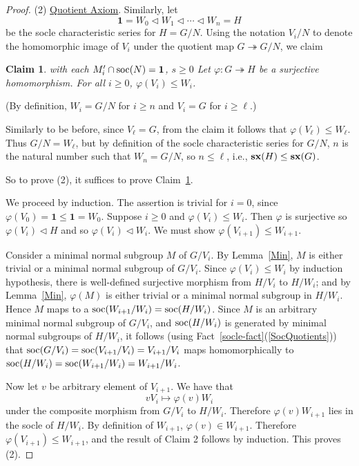 \documentclass[a4paper,11pt]{amsart}
\newtheorem{claim}{Claim}
\theoremstyle{definition}
\newcommand{\sx}{{\bf sx}}
\newcommand{\soc}{\mbox{\rm soc}}
\newcommand{\sur}{\twoheadrightarrow}
\newcommand{\1}{{\mathbf 1}}
\begin{document}
\begin{proof}
\noindent
 (2) \underline{Quotient Axiom}.    Similarly, let 
$$\1 =W_0 \lhd W_1 \lhd \cdots \lhd W_{n} = H$$
be the socle characteristic series for $H=G/N$.  Using the notation $V_i/N$ to denote the homomorphic image of $V_i$ under the quotient map $G\sur G/N$, we claim
\begin{claim} \label{Qclaim}with each $M_i'\cap \soc(N)=\1$, $s\geq 0$
Let $\varphi:G \sur H$ be a surjective homomorphism.
For all $i\geq 0$,
$\varphi(V_i) \leq W_i$.
 \end{claim}
 
 \noindent (By definition, $W_i=G/N$ for $i\geq n$ and $V_i=G$ for $i\geq \ell$.)


Similarly to be before, since $V_{\ell}=G$, from the claim it follows that $\varphi(V_{\ell})  \leq W_{\ell}$.  Thus $G/N=W_{\ell}$, but by definition of the socle characteristic series for $G/N$, $n$ is the natural number such that
$W_n=G/N$, so $n \leq \ell$, i.e., $\sx(H)\leq \sx(G)$.


So to prove (2), it suffices to  prove Claim~\ref{Qclaim}. 

  We proceed by induction. The assertion is trivial for $i=0$, since $\varphi(V_0)=\1 \leq \1 =W_0$.  
Suppose $i\geq 0$ and $\varphi(V_i)\leq W_i$.
Then $\varphi$ is surjective so $\varphi(V_i)\lhd H$ and so $\varphi(V_i) \lhd W_i$.
We must show $\varphi(V_{i+1})\leq W_{i+1}$.

Consider a minimal normal subgroup $M$ of $G/V_i$.
By Lemma~\ref{Min},  $M$ is either trivial or a minimal normal subgroup of $G/V_i$.  Since $\varphi(V_i) \leq W_i$ by induction hypothesis, there is well-defined surjective morphism from $H/V_i$ to $H/W_i$; and by Lemma~\ref{Min},
$\varphi(M)$ is either trivial or a minimal normal subgroup in $H/W_i$.
Hence $M$ maps to a $\soc(W_{i+1}/W_i)=\soc(H/W_i)$.
Since $M$ is an arbitrary minimal normal subgroup of $G/V_i$, and $\soc(H/W_i)$ is generated by minimal normal subgroups of $H/W_i$, it follows (using Fact~\ref{socle-fact}(\ref{SocQuotients})) that $\soc(G/V_i)=\soc(V_{i+1}/V_i)=V_{i+1}/V_i$ maps homomorphically to $\soc(H/W_i)=\soc(W_{i+1}/W_i)=W_{i+1}/W_i$.

Now let $v$ be arbitrary element of $V_{i+1}$. We have that $$vV_i 
\mapsto \varphi(v)W_i $$
under the composite morphism from $G/V_i$ to $H/W_i$.
Therefore $\varphi(v)W_{i+1}$ lies in the socle of $H/W_i$. By definition of $W_{i+1}$, $\varphi(v)\in W_{i+1}$.  Therefore $\varphi(V_{i+1})\leq W_{i+1}$, and the result of Claim 2 follows by induction. This proves (2).
\end{proof} 
\end{document}
